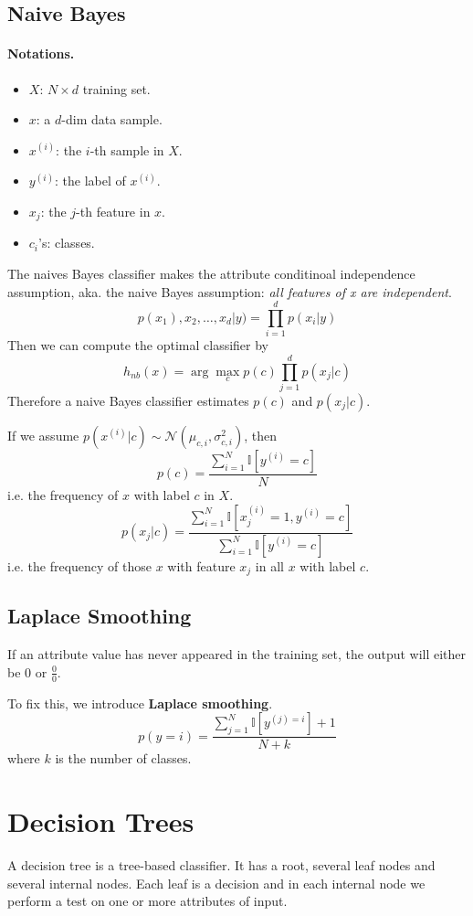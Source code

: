     \subsection{Naive Bayes}
        \paragraph{Notations.}
            \begin{itemize}
                \item $X$: $N \times d$ training set. 
                \item $x$: a $d$-dim data sample.
                \item $x^{(i)}$: the $i$-th sample in $X$.
                \item $y^{(i)}$: the label of $x^{(i)}$.
                \item $x_j$: the $j$-th feature in $x$.
                \item $c_i$'s: classes.
            \end{itemize}
        The naives Bayes classifier makes the attribute conditinoal independence assumption, aka. the naive Bayes assumption: \emph{all features of x are independent}.
        \[ p(x_1), x_2,\dots,x_d | y) = \prod_{i=1}^d p(x_i|y) \]
        Then we can compute the optimal classifier by
        \[ h_{nb}(x) = \arg\max_{c}p(c)\prod_{j=1}^d p(x_j|c) \]
        Therefore a naive Bayes classifier estimates $p(c)$ and $p(x_j|c)$.

        If we assume $p(x^{(i)}|c) \sim \mathcal{N}(\mu_{c,i}, \sigma^2_{c,i})$, then
        \[ p(c) = \frac{\sum_{i=1}^N\mathbb{I}[y^{(i)}=c]}{N} \]
        i.e. the frequency of $x$ with label $c$ in $X$.
        \[ p(x_j|c) = \frac{\sum_{i=1}^N\mathbb{I}[x^{(i)}_j = 1, y^{(i)}=c]}{\sum_{i=1}^N\mathbb{I}[y^{(i)}=c]} \]
        i.e. the frequency of those $x$ with feature $x_j$ in all $x$ with label $c$.

    \subsection{Laplace Smoothing}
        If an attribute value has never appeared in the training set, the output will either be $0$ or $\frac{0}{0}$.

        To fix this, we introduce \textbf{Laplace smoothing}.
        \[ p(y=i) = \frac{\sum_{j=1}^N\mathbb{I}[y^{(j)=i}] + 1}{N + k} \]
        where $k$ is the number of classes.


\section{Decision Trees}
    A decision tree is a tree-based classifier. It has a root, several leaf nodes and several internal nodes. Each leaf is a decision and in each internal node we perform a test on one or more attributes of input.

